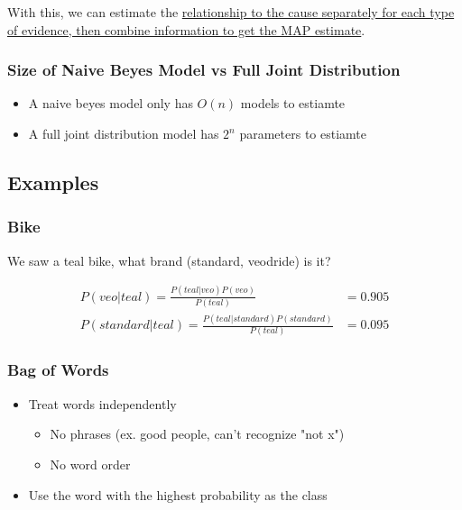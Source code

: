     With this, we can estimate the \ul{relationship to the cause separately
    for each type of evidence, then combine information to get the MAP
    estimate}.

    \subsubsection{Size of Naive Beyes Model vs Full Joint Distribution}

      \begin{itemize}
        \item A naive beyes model only has $ O\left( n \right) $ models to
        estiamte
        \item A full joint distribution model has $ 2^{n} $ parameters to
        estiamte
      \end{itemize}

  \subsection{Examples}

    \subsubsection{Bike}

      We saw a teal bike, what brand (standard, veodride) is it?

      \begin{align*}
        P(veo | teal) = \frac{P(teal | veo) P(veo)}{P(teal)} &= 0.905 \\
        P(standard | teal) = \frac{P(teal | standard) P(standard)}{P(teal)} &= 0.095
      \end{align*}

    \subsubsection{Bag of Words}

      \begin{itemize}
        \item Treat words independently
        \begin{itemize}
          \item No phrases (ex. good people, can't recognize "not x")
          \item No word order
        \end{itemize}

        \item Use the word with the highest probability as the class
      \end{itemize}

